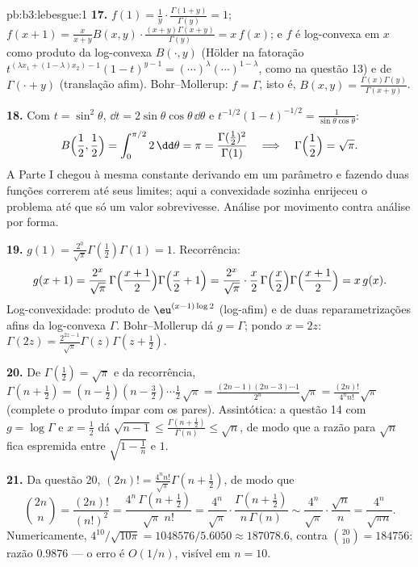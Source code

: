 \begin{solution}{pb:b3:lebesgue:1}
\textbf{17.} $f(1) = \frac1y\cdot\frac{\Gamma(1+y)}{\Gamma(y)}
= 1$; $f(x+1) = \frac{x}{x+y}B(x,y)\cdot\frac{(x+y)\Gamma(x+y)}
{\Gamma(y)} = x\,f(x)$; e $f$ é log-convexa em $x$ como
produto da log-convexa $B(\cdot, y)$ (Hölder na
fatoração $t^{(\lambda x_1 + (1-\lambda)x_2)-1}(1-t)^{y-1}
= (\cdots)^\lambda(\cdots)^{1-\lambda}$, como na questão 13)
e de $\Gamma(\cdot + y)$ (translação afim). Bohr--Mollerup: $f =
\Gamma$, isto é, $B(x, y) =
\frac{\Gamma(x)\Gamma(y)}{\Gamma(x+y)}$.

\textbf{18.} Com $t = \sin^2\theta$, $\dd t =
2\sin\theta\cos\theta\,\dd\theta$ e $t^{-1/2}(1-t)^{-1/2} =
\frac1{\sin\theta\cos\theta}$:
\[
B\Bigl(\frac12, \frac12\Bigr) =
\int_0^{\pi/2}2\,\dd\theta = \pi
= \frac{\Gamma(\frac12)^2}{\Gamma(1)}
\quad\Longrightarrow\quad
\Gamma\Bigl(\frac12\Bigr) = \sqrt\pi .
\]
A Parte I chegou à mesma constante derivando em um
parâmetro e fazendo duas funções correrem até seus limites; aqui
a convexidade sozinha enrijeceu o problema até que só um valor
sobrevivesse. Análise por movimento contra análise por forma.

\textbf{19.} $g(1) = \frac{2^0}{\sqrt\pi}\Gamma(\frac12)
\Gamma(1) = 1$. Recorrência:
\[
g(x+1) = \frac{2^{x}}{\sqrt\pi}\,
\Gamma\Bigl(\frac{x+1}2\Bigr)\Gamma\Bigl(\frac x2 + 1\Bigr)
= \frac{2^{x}}{\sqrt\pi}\cdot\frac x2\,
\Gamma\Bigl(\frac x2\Bigr)\Gamma\Bigl(\frac{x+1}2\Bigr)
= x\,g(x) .
\]
Log-convexidade: produto de $\eu^{(x-1)\log2}$ (log-afim) e de
duas reparametrizações afins da log-convexa $\Gamma$.
Bohr--Mollerup dá $g = \Gamma$; pondo $x = 2z$:
$\Gamma(2z) = \frac{2^{2z-1}}{\sqrt\pi}\Gamma(z)\Gamma(z +
\frac12)$.

\textbf{20.} De $\Gamma(\frac12) = \sqrt\pi$ e da
recorrência, $\Gamma(n + \frac12) = (n - \frac12)(n -
\frac32)\cdots\frac12\,\sqrt\pi =
\frac{(2n-1)(2n-3)\cdots1}{2^n}\sqrt\pi =
\frac{(2n)!}{4^nn!}\sqrt\pi$ (complete o produto ímpar com
os pares). Assintótica: a questão 14 com $g = \log\Gamma$
e $x = \frac12$ dá $\sqrt{n-1} \leq
\frac{\Gamma(n+\frac12)}{\Gamma(n)} \leq \sqrt n$, de modo que a
razão para $\sqrt n$ fica espremida entre $\sqrt{1 - \frac1n}$
e $1$.

\textbf{21.} Da questão 20, $(2n)! =
\frac{4^nn!}{\sqrt\pi}\Gamma(n + \tfrac12)$, de modo que
\[
\binom{2n}n = \frac{(2n)!}{(n!)^2}
= \frac{4^n\,\Gamma(n+\frac12)}{\sqrt\pi\;n!}
= \frac{4^n}{\sqrt\pi}\cdot
\frac{\Gamma(n+\frac12)}{n\,\Gamma(n)}
\sim \frac{4^n}{\sqrt\pi}\cdot\frac{\sqrt n}{n}
= \frac{4^n}{\sqrt{\pi n}} .
\]
Numericamente, $4^{10}/\sqrt{10\pi} = 1048576/5.6050 \approx
187078.6$, contra $\binom{20}{10} = 184756$: razão $0.9876$
--- o erro é $O(1/n)$, visível em $n = 10$.


\end{solution}

